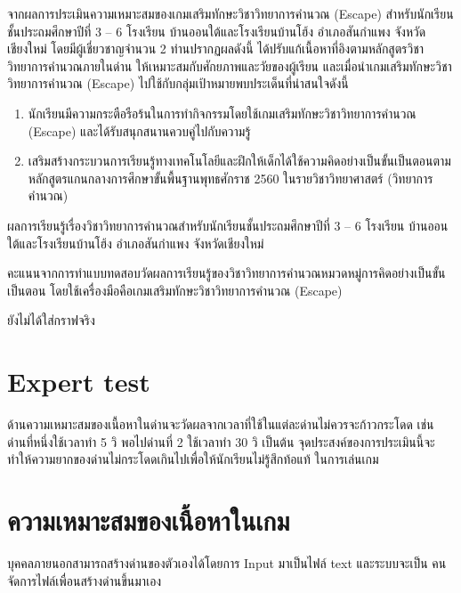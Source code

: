 จากผลการประเมินความเหมาะสมของเกมเสริมทักษะวิชาวิทยาการคำนวณ (Escape) สำหรับนักเรียนชั้นประถมศึกษาปีที่ 
3 – 6 โรงเรียน บ้านออนใต้และโรงเรียนบ้านโฮ้ง อำเภอสันกำแพง จังหวัดเชียงใหม่ 
โดยมีผู้เชี่ยวชาญจำนวน 2 ท่านปรากฏผลดังนี้ ได้ปรับแก้เนื้อหาที่อิงตามหลักสูตรวิชาวิทยาการคำนวณภายในด่าน 
ให้เหมาะสมกับศักยภาพและวัยของผู้เรียน และเมื่อนำเกมเสริมทักษะวิชาวิทยาการคำนวณ (Escape) 
ไปใช้กับกลุ่มเป้าหมายพบประเด็นที่น่าสนใจดังนี้
\begin{enumerate}
    \item นักเรียนมีความกระตือรือร้นในการทำกิจกรรมโดยใช้เกมเสริมทักษะวิชาวิทยาการคำนวณ (Escape) และได้รับสนุกสนานควบคู่ไปกับความรู้ 
    \item เสริมสร้างกระบวนการเรียนรู้ทางเทคโนโลยีและฝึกให้เด็กได้ใช้ความคิดอย่างเป็นขั้นเป็นตอนตามหลักสูตรแกนกลางการศึกษาขั้นพื้นฐานพุทธศักราช 2560 ในรายวิชาวิทยาศาสตร์ (วิทยาการคำนวณ)
\end{enumerate}
ผลการเรียนรู้เรื่องวิชาวิทยาการคำนวณสำหรับนักเรียนชั้นประถมศึกษาปีที่ 3 – 6 โรงเรียน บ้านออนใต้และโรงเรียนบ้านโฮ้ง อำเภอสันกำแพง จังหวัดเชียงใหม่\par
คะแนนจากการทำแบบทดสอบวัดผลการเรียนรู้ของวิชาวิทยาการคำนวณหมวดหมู่การคิดอย่างเป็นขั้นเป็นตอน โดยใช้เครื่องมือคือเกมเสริมทักษะวิชาวิทยาการคำนวณ (Escape)\par
\bigskip
ยังไม่ได้ใส่กราฟจริง
\section{Expert test}
ด้านความเหมาะสมของเนื้อหาในด่านจะวัดผลจากเวลาที่ใช้ในแต่ละด่านไม่ควรจะก้าวกระโดด
เช่น ด่านที่หนึ่งใช้เวลาทำ 5 วิ พอไปด่านที่ 2 ใช้เวลาทำ 30 วิ เป็นต้น
จุดประสงค์ของการประเมินนี้จะทำให้ความยากของด่านไม่กระโดดเกินไปเพื่อให้นักเรียนไม่รู้สึกท้อแท้
ในการเล่นเกม
\section{ความเหมาะสมของเนื้อหาในเกม}
บุคคลภายนอกสามารถสร้างด่านของตัวเองได้โดยการ Input มาเป็นไฟล์ text และระบบจะเป็น
คนจัดการไฟล์เพื่อนสร้างด่านขึ้นมาเอง


